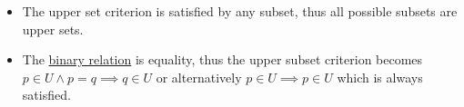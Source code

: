 \begin{itemize}
    \item The upper set criterion is satisfied by any subset, thus all possible subsets are upper sets.
    \item The \href{doc/1 math/Seven Sketches in Compositionality/1 Chapter 1: Generative Effects/2 What is order/Relation}{binary relation} is equality, thus the upper subset criterion becomes $p \in U \land p = q \implies q \in U$ or alternatively $p \in U \implies p \in U$ which is always satisfied.
  \end{itemize}